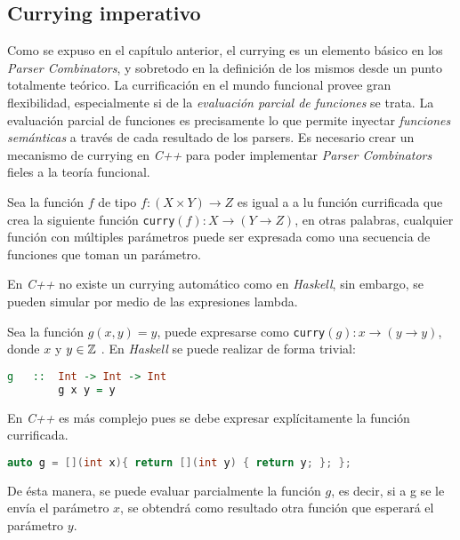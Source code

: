 	\subsection{Currying imperativo}
	Como se expuso en el capítulo anterior, el currying es un elemento básico en los \emph{Parser Combinators}, y sobretodo en la definición de los mismos desde un punto totalmente teórico. La currificación en el mundo funcional provee gran flexibilidad, especialmente si de la \emph{evaluación parcial de funciones} se trata. La evaluación parcial de funciones es precisamente lo que permite inyectar \emph{funciones semánticas} a través de cada resultado de los parsers.
	Es necesario crear un mecanismo de currying en \emph{C++} para poder implementar \emph{Parser Combinators} fieles a la teoría funcional.
	
	\begin{exmp}
		Sea la función $f$ de tipo
		$f:(X \times Y) \to Z$ es igual a a lu función currificada que crea la siguiente función \texttt{curry}$(f): X \to (Y \to Z)$, en otras palabras, cualquier función con múltiples parámetros puede ser expresada como una secuencia de funciones que toman un parámetro.		
	\end{exmp}
	
	En \emph{C++} no existe un currying automático como en \emph{Haskell}, sin embargo, se pueden simular por medio de las expresiones lambda.
	
	\begin{exmp}
		Sea la función $g(x,y) = y$, puede expresarse como \texttt{curry}$(g): x \to (y \to y)$, donde $x$ y $y \in \mathbb{Z}$ . En \emph{Haskell} se puede realizar de forma trivial:
		\begin{lstlisting}[language=Haskell, caption=g currificada en Haskell]
		g	::	Int -> Int -> Int
		g x y = y
		\end{lstlisting}
		
		En \emph{C++} es más complejo pues se debe expresar explícitamente la función currificada.		
		
		\begin{lstlisting}[language=C++, caption=g currificada en C++]
		auto g = [](int x){ return [](int y) { return y; }; };
		\end{lstlisting}	
		
		De ésta manera, se puede evaluar parcialmente la función $g$, es decir, si a g se le envía el parámetro $x$, se obtendrá como resultado otra función que esperará el parámetro $y$.	
	\end{exmp}
	
